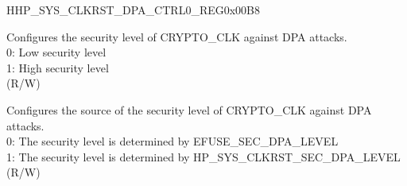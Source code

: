 \begin{register}{H}{HP\_SYS\_CLKRST\_DPA\_CTRL0\_REG}{0x00B8}\label{regdesc:HPSYSCLKRSTDPACTRL0REG}
%
%
%
\regnewline%
\begin{regdesc}\begin{reglist}
\label{fielddesc:HPSYSCLKRSTSECDPALEVEL}\item [HP\_SYS\_CLKRST\_SEC\_DPA\_LEVEL] Configures the security level of CRYPTO\_CLK against DPA attacks.\\
0: Low security level\\
1: High security level\\ (R/W)
\label{fielddesc:HPSYSCLKRSTSECDPACFGSEL}\item [HP\_SYS\_CLKRST\_SEC\_DPA\_CFG\_SEL] Configures the source of the security level of CRYPTO\_CLK against DPA attacks.\\
0: The security level is determined by EFUSE\_SEC\_DPA\_LEVEL\\
1: The security level is determined by HP\_SYS\_CLKRST\_SEC\_DPA\_LEVEL\\ (R/W)
\end{reglist}\end{regdesc}
\end{register}


